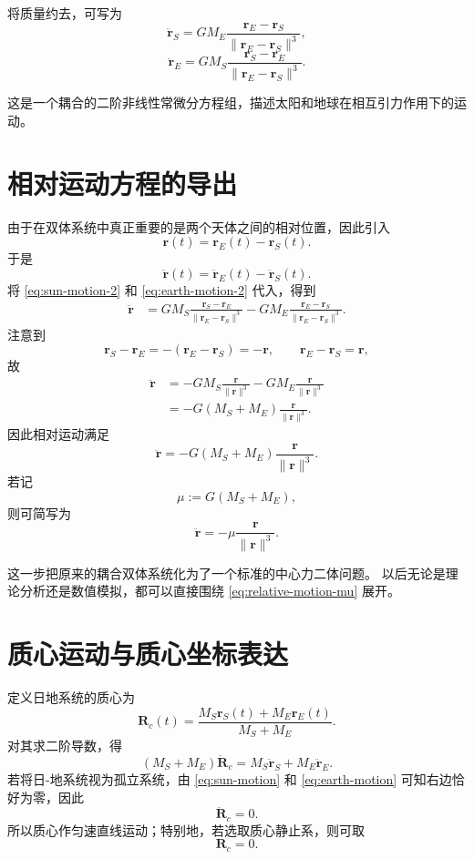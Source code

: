 将质量约去，可写为
\begin{equation}\label{eq:sun-motion-2}
\ddot{\bm r}_S
=
G M_E
\frac{\bm r_E-\bm r_S}{\|\bm r_E-\bm r_S\|^3},
\end{equation}
\begin{equation}\label{eq:earth-motion-2}
\ddot{\bm r}_E
=
G M_S
\frac{\bm r_S-\bm r_E}{\|\bm r_E-\bm r_S\|^3}.
\end{equation}

这是一个耦合的二阶非线性常微分方程组，描述太阳和地球在相互引力作用下的运动。

\section{相对运动方程的导出}

由于在双体系统中真正重要的是两个天体之间的相对位置，因此引入
\[
\bm r(t)=\bm r_E(t)-\bm r_S(t).
\]
于是
\[
\ddot{\bm r}(t)=\ddot{\bm r}_E(t)-\ddot{\bm r}_S(t).
\]
将 \eqref{eq:sun-motion-2} 和 \eqref{eq:earth-motion-2} 代入，得到
\begin{align*}
\ddot{\bm r}
&=
G M_S \frac{\bm r_S-\bm r_E}{\|\bm r_E-\bm r_S\|^3}
-
G M_E \frac{\bm r_E-\bm r_S}{\|\bm r_E-\bm r_S\|^3}.
\end{align*}
注意到
\[
\bm r_S-\bm r_E=-(\bm r_E-\bm r_S)=-\bm r,
\qquad
\bm r_E-\bm r_S=\bm r,
\]
故
\begin{align*}
\ddot{\bm r}
&=
- G M_S \frac{\bm r}{\|\bm r\|^3}
- G M_E \frac{\bm r}{\|\bm r\|^3} \\
&=
- G(M_S+M_E)\frac{\bm r}{\|\bm r\|^3}.
\end{align*}
因此相对运动满足
\begin{equation}\label{eq:relative-motion}
\ddot{\bm r}
=
- G(M_S+M_E)\frac{\bm r}{\|\bm r\|^3}.
\end{equation}
若记
\[
\mu:=G(M_S+M_E),
\]
则可简写为
\begin{equation}\label{eq:relative-motion-mu}
\ddot{\bm r}=-\mu \frac{\bm r}{\|\bm r\|^3}.
\end{equation}

这一步把原来的耦合双体系统化为了一个标准的中心力二体问题\cite{MurrayDermott1999,BateMuellerWhite1971}。
以后无论是理论分析还是数值模拟，都可以直接围绕 \eqref{eq:relative-motion-mu} 展开。

\section{质心运动与质心坐标表达}

定义日地系统的质心为
\[
\bm R_c(t)=\frac{M_S\bm r_S(t)+M_E\bm r_E(t)}{M_S+M_E}.
\]
对其求二阶导数，得
\[
(M_S+M_E)\ddot{\bm R}_c=M_S\ddot{\bm r}_S+M_E\ddot{\bm r}_E.
\]
若将日-地系统视为孤立系统，由 \eqref{eq:sun-motion} 和 \eqref{eq:earth-motion} 可知右边恰好为零，因此
\[
\ddot{\bm R}_c=0.
\]
所以质心作匀速直线运动；特别地，若选取质心静止系，则可取\cite{MurrayDermott1999,BateMuellerWhite1971}
\[
\bm R_c=0.
\]

